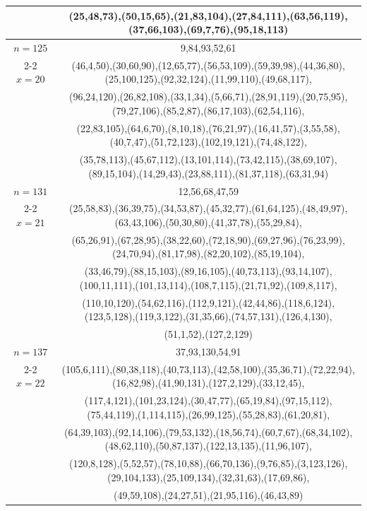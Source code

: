 \begin{tabular}{| c | c |}
&(25,48,73),(50,15,65),(21,83,104),(27,84,111),(63,56,119),(37,66,103),(69,7,76),(95,18,113)\\
\hline 
\(n=125\) & 
9,84,93,52,61\\
\cline{2-2}
\(x=20\)
&(46,4,50),(30,60,90),(12,65,77),(56,53,109),(59,39,98),(44,36,80),(25,100,125),(92,32,124),(11,99,110),(49,68,117),\\
&(96,24,120),(26,82,108),(33,1,34),(5,66,71),(28,91,119),(20,75,95),(79,27,106),(85,2,87),(86,17,103),(62,54,116),\\
&(22,83,105),(64,6,70),(8,10,18),(76,21,97),(16,41,57),(3,55,58),(40,7,47),(51,72,123),(102,19,121),(74,48,122),\\
&(35,78,113),(45,67,112),(13,101,114),(73,42,115),(38,69,107),(89,15,104),(14,29,43),(23,88,111),(81,37,118),(63,31,94)\\
\hline 
\(n=131\) & 
12,56,68,47,59\\
\cline{2-2}
\(x=21\)
&(25,58,83),(36,39,75),(34,53,87),(45,32,77),(61,64,125),(48,49,97),(63,43,106),(50,30,80),(41,37,78),(55,29,84),\\
&(65,26,91),(67,28,95),(38,22,60),(72,18,90),(69,27,96),(76,23,99),(24,70,94),(81,17,98),(82,20,102),(85,19,104),\\
&(33,46,79),(88,15,103),(89,16,105),(40,73,113),(93,14,107),(100,11,111),(101,13,114),(108,7,115),(21,71,92),(109,8,117),\\
&(110,10,120),(54,62,116),(112,9,121),(42,44,86),(118,6,124),(123,5,128),(119,3,122),(31,35,66),(74,57,131),(126,4,130),\\
&(51,1,52),(127,2,129)\\
\hline 
\(n=137\) & 
37,93,130,54,91\\
\cline{2-2}
\(x=22\)
&(105,6,111),(80,38,118),(40,73,113),(42,58,100),(35,36,71),(72,22,94),(16,82,98),(41,90,131),(127,2,129),(33,12,45),\\
&(117,4,121),(101,23,124),(30,47,77),(65,19,84),(97,15,112),(75,44,119),(1,114,115),(26,99,125),(55,28,83),(61,20,81),\\
&(64,39,103),(92,14,106),(79,53,132),(18,56,74),(60,7,67),(68,34,102),(48,62,110),(50,87,137),(122,13,135),(11,96,107),\\
&(120,8,128),(5,52,57),(78,10,88),(66,70,136),(9,76,85),(3,123,126),(29,104,133),(25,109,134),(32,31,63),(17,69,86),\\
&(49,59,108),(24,27,51),(21,95,116),(46,43,89)\\
\hline 
\end{tabular}